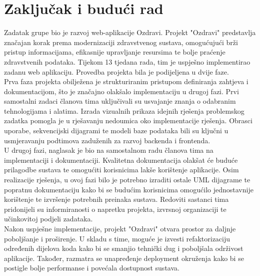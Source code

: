 \chapter{Zaključak i budući rad}
		
		
		

		 Zadatak grupe bio je razvoj web-aplikacije Ozdravi. Projekt "Ozdravi" predstavlja značajan korak prema modernizaciji zdravstvenog sustava, omogućujući brži pristup informacijama, efikasnije upravljanje resursima te bolje praćenje zdravstvenih podataka. Tijekom 13 tjedana rada, tim je uspješno implementirao zadanu web aplikaciju. Provedba projekta bila je podijeljena u dvije faze. \\
		 Prva faza projekta obilježena je strukturiranim pristupom definiranja zahtjeva i dokumentacijom, što je značajno olakšalo implementaciju u drugoj fazi. Prvi samostalni zadaci članova tima uključivali su usvajanje znanja o odabranim tehnologijama i alatima. Izrada vizualnih prikaza idejnih rješenja problemskog zadatka pomogla je u rješavanju nedoumica oko implementacije rješenja. Obrasci uporabe, sekvencijski dijagrami te modeli baze podataka bili su ključni u usmjeravanju podtimova zaduženih za razvoj backenda i frontenda. \\
		 U drugoj fazi, naglasak je bio na samostalnom radu članova tima na implementaciji i dokumentaciji. Kvalitetna dokumentacija olakšat će buduće prilagodbe sustava te omogućiti korisnicima lakše korištenje aplikacije. Osim realizacije rješenja, u ovoj fazi bilo je potrebno izraditi ostale UML dijagrame te popratnu dokumentaciju kako bi se budućim korisnicima omogućilo jednostavnije korištenje te izvršenje potrebnih preinaka sustava. 
		 Redoviti sastanci tima pridonijeli su informiranosti o napretku projekta, izvrsnoj organizaciji te učinkovitoj podjeli zadataka. \\
		 Nakon uspješne implementacije, projekt "Ozdravi" otvara prostor za daljnje poboljšanje i proširenje. U skladu s time, moguće je izvesti refaktorizaciju određenih dijelova koda kako bi se smanjio tehnički dug i poboljšala održivost aplikacije. Također, razmatra se unapređenje deployment okruženja kako bi se postigle bolje performanse i povećala dostupnost sustava.
